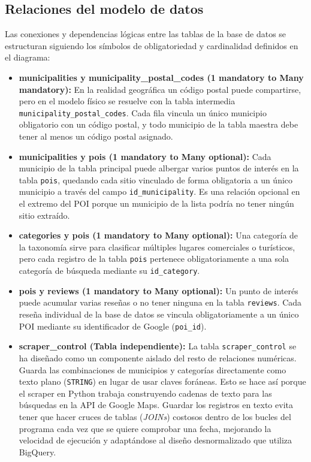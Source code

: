 \subsection{Relaciones del modelo de datos}
Las conexiones y dependencias lógicas entre las tablas de la base de datos se estructuran siguiendo los símbolos de obligatoriedad y cardinalidad definidos en el diagrama:

\begin{itemize}
	\tightlist
	\item \textbf{municipalities y municipality\_postal\_codes (1 mandatory to Many mandatory):} En la realidad geográfica un código postal puede compartirse, pero en el modelo físico se resuelve con la tabla intermedia \texttt{municipality\_postal\_codes}. Cada fila vincula un único municipio obligatorio con un código postal, y todo municipio de la tabla maestra debe tener al menos un código postal asignado.
	\item \textbf{municipalities y pois (1 mandatory to Many optional):} Cada municipio de la tabla principal puede albergar varios puntos de interés en la tabla \texttt{pois}, quedando cada sitio vinculado de forma obligatoria a un único municipio a través del campo \texttt{id\_municipality}. Es una relación opcional en el extremo del POI porque un municipio de la lista podría no tener ningún sitio extraído.
	\item \textbf{categories y pois (1 mandatory to Many optional):} Una categoría de la taxonomía sirve para clasificar múltiples lugares comerciales o turísticos, pero cada registro de la tabla \texttt{pois} pertenece obligatoriamente a una sola categoría de búsqueda mediante su \texttt{id\_category}.
	\item \textbf{pois y reviews (1 mandatory to Many optional):} Un punto de interés puede acumular varias reseñas o no tener ninguna en la tabla \texttt{reviews}. Cada reseña individual de la base de datos se vincula obligatoriamente a un único POI mediante su identificador de Google (\texttt{poi\_id}).
	\item \textbf{scraper\_control (Tabla independiente):} La tabla \texttt{scraper\_control} se ha diseñado como un componente aislado del resto de relaciones numéricas. Guarda las combinaciones de municipios y categorías directamente como texto plano (\texttt{STRING}) en lugar de usar claves foráneas. Esto se hace así porque el scraper en Python trabaja construyendo cadenas de texto para las búsquedas en la API de Google Maps. Guardar los registros en texto evita tener que hacer cruces de tablas (\textit{JOINs}) costosos dentro de los bucles del programa cada vez que se quiere comprobar una fecha, mejorando la velocidad de ejecución y adaptándose al diseño desnormalizado que utiliza BigQuery.
\end{itemize}

